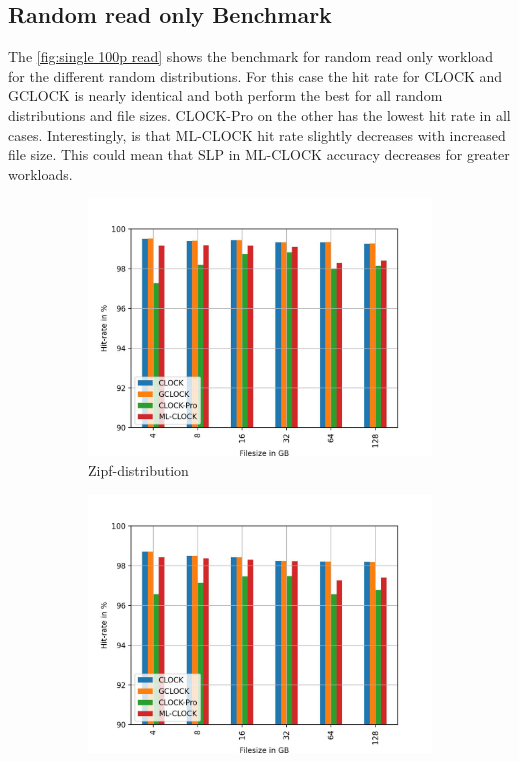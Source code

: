 \documentclass[
	12pt,
	a4paper,
	abstract,
	bibliography=totoc,
	chapterprefix,
	headings=openright,
	numbers=endperiod,
	parskip=half,
	twoside,
]{scrreprt}
\begin{document}
\subsection{Random read only Benchmark}

The \cref{fig:single 100p read} shows the benchmark for random read only workload for the different random distributions.
For this case the hit rate for CLOCK and GCLOCK is nearly identical and both perform the best for all random distributions and file sizes. 
CLOCK-Pro on the other has the lowest hit rate in all cases.
Interestingly, is that ML-CLOCK hit rate slightly decreases with increased file size.
This could mean that SLP in ML-CLOCK accuracy decreases for greater workloads. 

\begin{figure}[H]
	\centering
	\begin{subfigure}{0.4\textwidth}
		\includegraphics[width=\textwidth]{randread_zipf.jpg}		
		\caption{Zipf-distribution}
		\label{fig:randread zipf}
	\end{subfigure}
	\hfill
	\begin{subfigure}{0.4\textwidth}
		\includegraphics[width=\textwidth]{randread_normal.jpg}		

\end{subfigure}
\end{figure}
\end{document}
